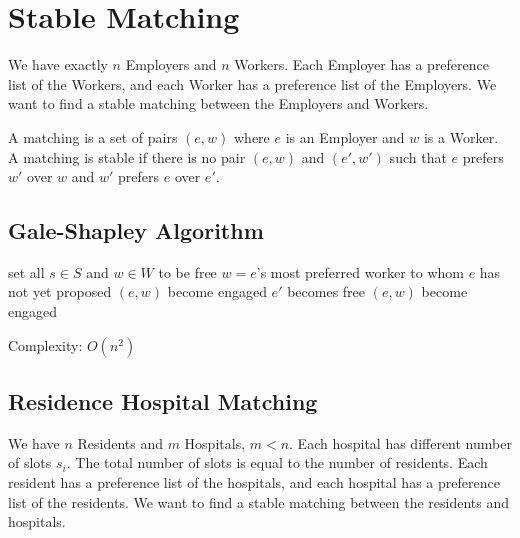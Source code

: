 \documentclass[11pt,fleqn]{article}
\begin{document}
\section{Stable Matching}
We have exactly $n$ Employers and $n$ Workers. Each Employer has a preference list of the Workers, and each Worker has a preference list of the Employers. We want to find a stable matching between the Employers and Workers. 

A matching is a set of pairs $(e, w)$ where $e$ is an Employer and $w$ is a Worker. A matching is stable if there is no pair $(e, w)$ and $(e', w')$ such that $e$ prefers $w'$ over $w$ and $w'$ prefers $e$ over $e'$.
\subsection{Gale-Shapley Algorithm}

\begin{algorithmic}[1]
    \State set all $s\in S$ and $w\in W$ to be free
        \State $w = e$'s most preferred worker to whom $e$ has not yet proposed
            \State $(e, w)$ become engaged
        \Else
                \State $e'$ becomes free
                \State $(e, w)$ become engaged
            \EndIf
        \EndIf
    \EndWhile
\end{algorithmic}
Complexity: $O(n^2)$

\subsection{Residence Hospital Matching}
We have $n$ Residents and $m$ Hospitals, $m<n$. Each hospital has different number of slots $s_i$. The total number of slots is equal to the number of residents. Each resident has a preference list of the hospitals, and each hospital has a preference list of the residents. We want to find a stable matching between the residents and hospitals.
\end{document}

